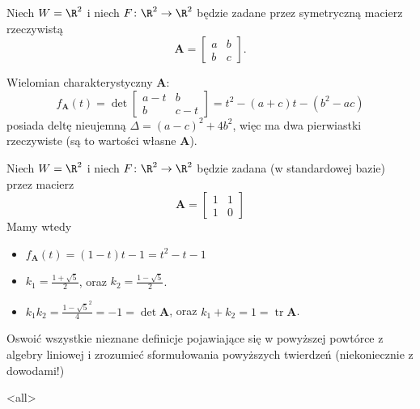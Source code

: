 \begin{frame}
Niech $W=\R^2$ i niech $F\colon \R^{2} \to \R^2$ będzie zadane przez symetryczną macierz rzeczywistą
\[\mathbf{A}=\left[\begin{array}{cc}
   a & b\\
   b & c
  \end{array}\right].
\] 

\pause Wielomian charakterystyczny $\mathbf{A}$:
\[f_{\mathbf{A}}(t) = \det\left[\begin{array}{cc}
   a -t & b\\
   b & c -t
  \end{array}\right]= t^2 -(a+c) t - (b^2 - ac)\]
\pause posiada deltę nieujemną $\Delta=(a-c)^2+4b^2$, więc ma dwa pierwiastki rzeczywiste (są to wartości własne $\mathbf{A}$).

\end{frame}

\begin{frame}[<+->]
\begin{przyklad}
Niech $W=\R^2$ i niech $F\colon \R^2 \to \R^2$ będzie zadana (w standardowej bazie) przez macierz
\[\mathbf{A}=\left[\begin{array}{cc}
   1 & 1\\
   1 & 0
  \end{array}\right]\]
Mamy wtedy 
\begin{itemize}
 \item $f_{\mathbf{A}} (t)=(1-t)t-1=t^2-t-1$
\item $k_1=\frac{1+\sqrt{5}}{2}$, oraz $k_2=\frac{1-\sqrt{5}}{2}$.
\item $k_1k_2=\frac{1-\sqrt{5}^2}{4}=-1=\det\mathbf{A}$, oraz $k_1+k_2=1=\operatorname{tr}\mathbf{A}$. 
\end{itemize}

\end{przyklad} 

\end{frame}

\begin{frame}
\begin{exercise}
Oswoić wszystkie nieznane definicje pojawiające się w powyższej powtórce z algebry liniowej i zrozumieć sformułowania powyższych twierdzeń (niekoniecznie z dowodami!)

\end{exercise}
\end{frame}

\mode<all> 
